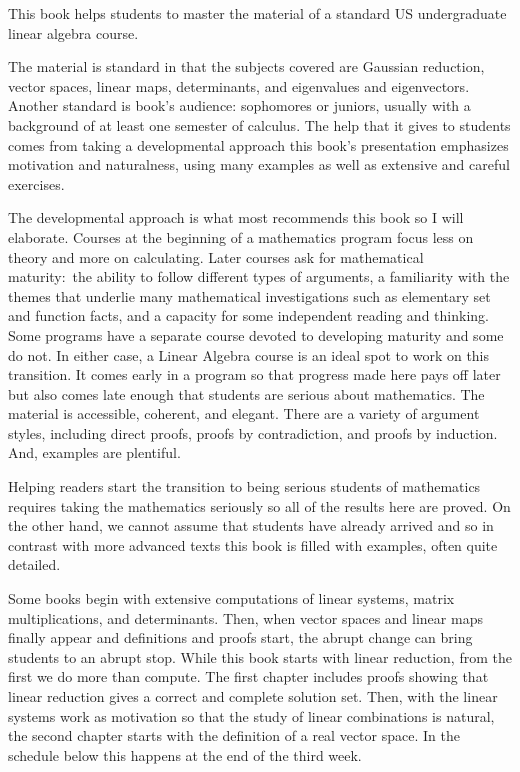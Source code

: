{\setlength{\parskip}{.7ex}  %
\bigskip
\vspace*{1.25in plus .2in minus .1in}
\vspace*{.4in plus .1in minus .05in}
\par\noindent
This book helps students to master the material of a standard 
US undergraduate linear algebra course.

The material is standard in that the subjects covered are
Gaussian reduction, 
vector spaces, linear maps,
determinants, and eigenvalues and eigenvectors.
Another standard is book's audience:
sophomores or juniors, usually with a background 
of at least one semester of calculus. 
The help that it gives to students comes from taking a developmental 
approach\Dash 
this book's presentation emphasizes motivation and naturalness, 
using many examples as well as extensive and careful exercises.

The developmental approach is what most recommends this book
so I will elaborate.
Courses at the beginning of a mathematics program
focus less on theory and more on calculating.
Later courses
ask for mathematical maturity:~the ability to follow different 
types of arguments, 
a familiarity with
the themes that underlie many mathematical investigations such as
elementary set and function facts,
and a capacity for some independent reading and thinking.
Some programs have a separate course devoted to developing maturity and
some do not. 
In either case, a Linear Algebra course 
is an ideal spot to work on this transition.
It comes early in a program so that progress made here pays off later
but also comes late enough that
students are serious about mathematics.
The material is accessible, coherent, and elegant.
There are a variety of argument styles, including 
direct proofs, proofs by
contradiction, and proofs by induction.
And, examples are plentiful.

Helping readers start the transition to being serious students of 
mathematics
requires taking the mathematics seriously so
all of the results here are proved.
On the other hand, we cannot
assume that students have already arrived
and so 
in contrast with more advanced texts 
this book is filled with examples,
often quite detailed.

Some books
begin with extensive computations of linear systems, 
matrix multiplications, 
and determinants.
Then, when 
vector spaces and linear maps finally appear
and definitions and proofs start, the abrupt change
can bring students to an abrupt stop.
While this book starts with
linear reduction, from the first
we do more than compute.
The first chapter
includes proofs showing that linear reduction gives a correct and
complete solution set.
Then, with the linear systems work as motivation
so that the study of linear combinations is natural,
the second chapter starts with the definition of a real vector space.
In the schedule below this happens at the end of the third week.

}
